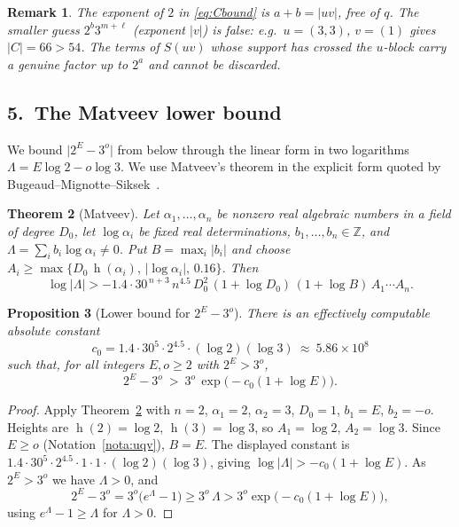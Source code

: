 \documentclass[11pt,a4paper]{article}
\theoremstyle{bourbaki}
\newtheorem{thm}{Theorem}[section]
\newtheorem{prop}[thm]{Proposition}
\theoremstyle{bourbakidef}
\newtheorem{rem}[thm]{Remark}
\newcommand{\Z}{\mathbb{Z}}
\newcommand{\height}{\operatorname{h}}
\begin{document}
\begin{rem}
The exponent of $2$ in \eqref{eq:Cbound} is $a+b=\lvert uv\rvert$, free of $q$. The smaller
guess $2^{b}3^{m+\ell}$ (exponent $\lvert v\rvert$) is false: e.g.\ $u=(3,3)$, $v=(1)$ gives
$\lvert C\rvert=66>54$. The terms of $S(uv)$ whose support has crossed the $u$-block carry a
genuine factor up to $2^{a}$ and cannot be discarded.
\end{rem}

\subsection*{5.\ The Matveev lower bound}

We bound $\lvert 2^{E}-3^{o}\rvert$ from below through the linear form in two logarithms
$\Lambda=E\log 2-o\log 3$. We use Matveev's theorem in the explicit form quoted by
Bugeaud--Mignotte--Siksek~\cite{BMS}.

\begin{thm}[Matveev]\label{thm:matveev}
Let $\alpha_{1},\dots,\alpha_{n}$ be nonzero real algebraic numbers in a field of degree
$D_{0}$, let $\log\alpha_{i}$ be fixed real determinations, $b_{1},\dots,b_{n}\in\Z$, and
$\Lambda=\sum_{i}b_{i}\log\alpha_{i}\ne 0$. Put $B=\max_{i}\lvert b_{i}\rvert$ and choose
$A_{i}\ge\max\{D_{0}\,\height(\alpha_{i}),\,\lvert\log\alpha_{i}\rvert,\,0.16\}$. Then
\[
   \log\lvert\Lambda\rvert
   >-1.4\cdot 30^{\,n+3}\,n^{4.5}\,D_{0}^{2}\,(1+\log D_{0})\,(1+\log B)\,A_{1}\cdots A_{n}.
\]
\end{thm}

\begin{prop}[Lower bound for $2^{E}-3^{o}$]\label{prop:lower}
There is an effectively computable absolute constant
\[
   c_{0}=1.4\cdot 30^{5}\cdot 2^{4.5}\cdot(\log 2)(\log 3)\ \approx\ 5.86\times 10^{8}
\]
such that, for all integers $E,o\ge 2$ with $2^{E}>3^{o}$,
\begin{equation}\label{eq:lower}
   2^{E}-3^{o}\ >\ 3^{o}\,\exp\!\bigl(-c_{0}(1+\log E)\bigr).
\end{equation}
\end{prop}

\begin{proof}
Apply Theorem~\ref{thm:matveev} with $n=2$, $\alpha_{1}=2$, $\alpha_{2}=3$, $D_{0}=1$,
$b_{1}=E$, $b_{2}=-o$. Heights are $\height(2)=\log 2$, $\height(3)=\log 3$, so
$A_{1}=\log 2$, $A_{2}=\log 3$. Since $E\ge o$ (Notation~\ref{nota:uqv}), $B=E$. The
displayed constant is $1.4\cdot 30^{5}\cdot 2^{4.5}\cdot 1\cdot 1\cdot(\log2)(\log3)$,
giving $\log\lvert\Lambda\rvert>-c_{0}(1+\log E)$. As $2^{E}>3^{o}$ we have $\Lambda>0$, and
\[
   2^{E}-3^{o}=3^{o}\bigl(e^{\Lambda}-1\bigr)\ge 3^{o}\,\Lambda
   >3^{o}\exp\!\bigl(-c_{0}(1+\log E)\bigr),
\]
using $e^{\Lambda}-1\ge\Lambda$ for $\Lambda>0$.
\end{proof}
\end{document}
